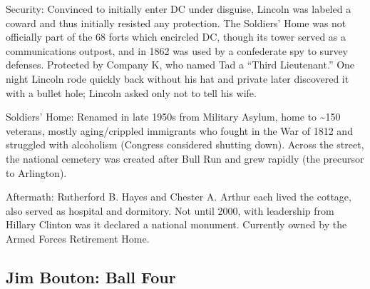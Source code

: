 \documentclass[
]{article}
\begin{document}
Security: Convinced to initially enter DC under disguise, Lincoln was
labeled a coward and thus initially resisted any protection. The
Soldiers' Home was not officially part of the 68 forts which encircled
DC, though its tower served as a communications outpost, and in 1862 was
used by a confederate spy to survey defenses. Protected by Company K,
who named Tad a ``Third Lieutenant.'' One night Lincoln rode quickly
back without his hat and private later discovered it with a bullet hole;
Lincoln asked only not to tell his wife.

Soldiers' Home: Renamed in late 1950s from Military Asylum, home to
\textasciitilde150 veterans, mostly aging/crippled immigrants who fought
in the War of 1812 and struggled with alcoholism (Congress considered
shutting down). Across the street, the national cemetery was created
after Bull Run and grew rapidly (the precursor to Arlington).

Aftermath: Rutherford B. Hayes and Chester A. Arthur each lived the
cottage, also served as hospital and dormitory. Not until 2000, with
leadership from Hillary Clinton was it declared a national monument.
Currently owned by the Armed Forces Retirement Home.

\hypertarget{jim-bouton-ball-four}{%
\subsection{Jim Bouton: Ball Four}\label{jim-bouton-ball-four}}
\end{document}

